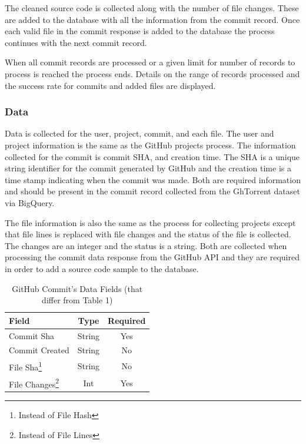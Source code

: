 \documentclass[12pt]{article}
\begin{document}
The cleaned source code is collected along with the number of file changes. These are added to the database with all the information from the commit record.
Once each valid file in the commit response is added to the database the process continues with the next commit record.

When all commit records are processed or a given limit for number of records to process is reached the process ends. Details on the range of records processed and the success rate for commits and added files are displayed.

\subsubsection*{Data}
Data is collected for the user, project, commit, and each file. The user and project information is the same as the GitHub projects process. The information collected for the commit is commit SHA, and creation time. The SHA is a unique string identifier for the commit generated by GitHub and the creation time is a time stamp indicating when the commit was made. Both are required information and should be present in the commit record collected from the GhTorrent dataset via BigQuery.

The file information is also the same as the process for collecting projects except that file lines is replaced with file changes and the status of the file is collected. The changes are an integer and the status is a string. Both are collected when processing the commit data response from the GitHub API and they are required in order to add a source code sample to the database.

\begin{table}[t]
    \begin{center}
        \caption{GitHub Commit's Data Fields (that differ from Table 1)}
        \label{tab:commit_data}
        \begin{tabular}{|l | c | c |}
            \hline
            \textbf{Field} & \textbf{Type} & \textbf{Required}\\
            \hline
            Commit Sha & String & Yes\\
            Commit Created & String & No\\
            File Sha\footnote{Instead of File Hash} & String & No\\
            File Changes\footnote{Instead of File Lines} & Int & Yes\\
            \hline
        \end{tabular}
    \end{center}
\end{table}
\end{document}
